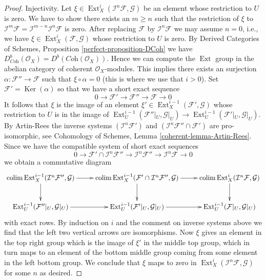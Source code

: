 \documentclass{stacks-project}
\theoremstyle{plain}
\theoremstyle{definition}
\theoremstyle{remark}
\numberwithin{equation}{subsection}
\def\colim{\mathop{\mathrm{colim}}\nolimits}
\def\Ext{\mathop{\mathrm{Ext}}\nolimits}
\def\Ker{\mathop{\mathrm{Ker}}}
\begin{document}
\begin{proof}
\medskip\noindent
Injectivity. Let $\xi \in \Ext^i_X(\mathcal{I}^n\mathcal{F}, \mathcal{G})$
be an element whose restriction to $U$ is zero. We have to show there exists
an $m \geq n$ such that the restriction of $\xi$ to
$\mathcal{I}^m\mathcal{F} = \mathcal{I}^{m - n}\mathcal{I}^n\mathcal{F}$
is zero. After replacing $\mathcal{F}$ by $\mathcal{I}^n\mathcal{F}$
we may assume $n = 0$, i.e., we have
$\xi \in \Ext^i_X(\mathcal{F}, \mathcal{G})$
whose restriction to $U$ is zero. By
Derived Categories of Schemes, Proposition \ref{perfect-proposition-DCoh}
we have
$D^b_{\textit{Coh}}(\mathcal{O}_X) = D^b(\textit{Coh}(\mathcal{O}_X))$.
Hence we can compute the $\Ext$ group in the abelian category of
coherent $\mathcal{O}_X$-modules. This implies there exists an
surjection $\alpha : \mathcal{F}'' \to \mathcal{F}$ such that
$\xi \circ \alpha = 0$ (this is where we use that $i > 0$).
Set $\mathcal{F}' = \Ker(\alpha)$ so that we have a short exact
sequence
$$
0 \to \mathcal{F}' \to \mathcal{F}'' \to \mathcal{F} \to 0
$$
It follows that $\xi$ is the image of an element
$\xi' \in \Ext^{i - 1}_X(\mathcal{F}', \mathcal{G})$
whose restriction to $U$ is in the image of
$\Ext^{i - 1}_U(\mathcal{F}''|_U, \mathcal{G}|_U) \to
\Ext^{i - 1}_U(\mathcal{F}'|_U, \mathcal{G}|_U)$.
By Artin-Rees the inverse systems $(\mathcal{I}^n\mathcal{F}')$ and
$(\mathcal{I}^n \mathcal{F}'' \cap \mathcal{F}')$ are pro-isomorphic, see
Cohomology of Schemes, Lemma \ref{coherent-lemma-Artin-Rees}.
Since we have the compatible system of short exact sequences
$$
0 \to
\mathcal{F}' \cap \mathcal{I}^n\mathcal{F}'' \to
\mathcal{I}^n\mathcal{F}'' \to
\mathcal{I}^n\mathcal{F} \to 0
$$
we obtain a commutative diagram
$$
\xymatrix{
\colim \Ext^{i - 1}_X(\mathcal{I}^n\mathcal{F}'', \mathcal{G})
\ar[r] \ar[d] &
\colim \Ext^{i - 1}_X(\mathcal{F}' \cap \mathcal{I}^n\mathcal{F}'', \mathcal{G})
\ar[r] \ar[d] &
\colim \Ext^i_X(\mathcal{I}^n\mathcal{F}, \mathcal{G})
\ar[d] \\
\Ext^{i - 1}_U(\mathcal{F}''|_U, \mathcal{G}|_U) \ar[r] &
\Ext^{i - 1}_U(\mathcal{F}'|_U, \mathcal{G}|_U) \ar[r] &
\Ext^{i - 1}_U(\mathcal{F}|_U, \mathcal{G}|_U)
}
$$
with exact rows. By induction on $i$ and the comment on inverse systems above
we find that the left two vertical arrows are isomorphisms.
Now $\xi$ gives an element in the top right group which is the image
of $\xi'$ in the middle top group, which in turn maps to an element of
the bottom middle group coming from some element in the left bottom group.
We conclude that $\xi$ maps to zero in
$\Ext^i_X(\mathcal{I}^n\mathcal{F}, \mathcal{G})$
for some $n$ as desired.


\end{proof}
\end{document}
